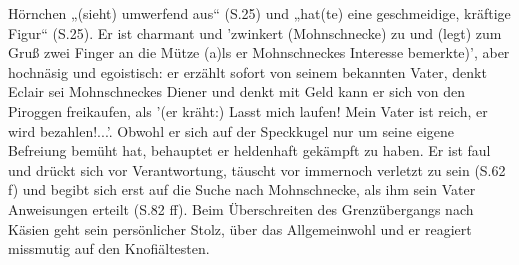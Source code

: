 {Hörnchen „(sieht) umwerfend aus“ (S.25) und „hat(te) eine geschmeidige, kräftige Figur“ (S.25). Er ist charmant und 'zwinkert (Mohnschnecke) zu und (legt) zum Gruß zwei Finger an die Mütze (a)ls er Mohnschneckes Interesse bemerkte)'\cite[S.25]{pir}, aber hochnäsig und egoistisch: er erzählt sofort von seinem bekannten Vater\cite[S.25]{pir}, denkt Eclair sei Mohnschneckes Diener\cite[S.26]{pir} und denkt mit Geld kann er sich von den Piroggen freikaufen, als '(er kräht:) Lasst mich laufen! Mein Vater ist reich, er wird bezahlen!...'.\cite[S.34]{pir} Obwohl er sich auf der Speckkugel nur um seine eigene Befreiung bemüht hat, behauptet er heldenhaft gekämpft zu haben.\cite[S.40]{pir} Er ist faul und drückt sich vor Verantwortung, täuscht vor immernoch verletzt zu sein (S.62 f) und begibt sich erst auf die Suche nach Mohnschnecke, als ihm sein Vater Anweisungen erteilt (S.82 ff). Beim Überschreiten des Grenzübergangs nach Käsien geht sein persönlicher Stolz, über das Allgemeinwohl und er reagiert missmutig auf den Knofiältesten.\cite[S.142f]{pir}
}
